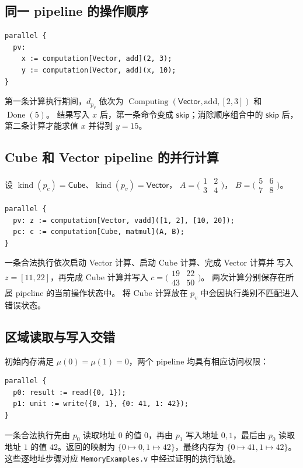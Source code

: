 \documentclass[UTF8,a4paper,11pt,fontset=fandol]{ctexart}
\newcommand{\code}{\nolinkurl}
\newcommand{\kw}[1]{\mathsf{#1}}
\newcommand{\kind}{\operatorname{kind}}
\newcommand{\Compute}{\operatorname{Computing}}
\newcommand{\Done}{\operatorname{Done}}
\begin{document}
\subsection{同一 pipeline 的操作顺序}

\begin{lstlisting}
parallel {
  pv:
    x := computation[Vector, add](2, 3);
    y := computation[Vector, add](x, 10);
}
\end{lstlisting}
第一条计算执行期间，$d_{p_v}$ 依次为
$\Compute(\mathsf{Vector},\mathrm{add},[2,3])$ 和 $\Done(5)$。
结果写入 $x$ 后，第一条命令变成 $\kw{skip}$；消除顺序组合中的
$\kw{skip}$ 后，第二条计算才能求值 $x$ 并得到 $y=15$。

\subsection{Cube 和 Vector pipeline 的并行计算}

设 $\kind(p_c)=\mathsf{Cube}$、$\kind(p_v)=\mathsf{Vector}$，
$A=\bigl(\begin{smallmatrix}1&2\\3&4\end{smallmatrix}\bigr)$，
$B=\bigl(\begin{smallmatrix}5&6\\7&8\end{smallmatrix}\bigr)$。
\begin{lstlisting}
parallel {
  pv: z := computation[Vector, vadd]([1, 2], [10, 20]);
  pc: c := computation[Cube, matmul](A, B);
}
\end{lstlisting}
一条合法执行依次启动 Vector 计算、启动 Cube 计算、完成 Vector 计算并
写入 $z=[11,22]$，再完成 Cube 计算并写入
$c=\bigl(\begin{smallmatrix}19&22\\43&50\end{smallmatrix}\bigr)$。
两次计算分别保存在所属 pipeline 的当前操作状态中。
将 Cube 计算放在 $p_v$ 中会因执行类别不匹配进入错误状态。

\subsection{区域读取与写入交错}

初始内存满足 $\mu(0)=\mu(1)=0$，两个 pipeline 均具有相应访问权限：
\begin{lstlisting}
parallel {
  p0: result := read({0, 1});
  p1: unit := write({0, 1}, {0: 41, 1: 42});
}
\end{lstlisting}
一条合法执行先由 $p_0$ 读取地址 $0$ 的值 $0$，再由 $p_1$ 写入地址
$0,1$，最后由 $p_0$ 读取地址 $1$ 的值 $42$。返回的映射为
$\{0\mapsto0,1\mapsto42\}$，最终内存为 $\{0\mapsto41,1\mapsto42\}$。
这些逐地址步骤对应 \code{MemoryExamples.v} 中经过证明的执行轨迹。
\end{document}
